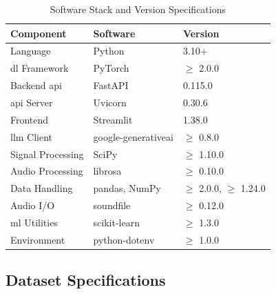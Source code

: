 \begin{table}[H]
\centering
\caption{Software Stack and Version Specifications}
\renewcommand{\arraystretch}{1.3}
\begin{tabular}{|l|l|l|}
\hline
\textbf{Component} & \textbf{Software} & \textbf{Version} \\
\hline
Language & Python & 3.10+ \\
\ac{dl} Framework & PyTorch & $\geq$ 2.0.0 \\
Backend \ac{api} & FastAPI & 0.115.0 \\
\ac{api} Server & Uvicorn & 0.30.6 \\
Frontend & Streamlit & 1.38.0 \\
\ac{llm} Client & google-generativeai & $\geq$ 0.8.0 \\
Signal Processing & SciPy & $\geq$ 1.10.0 \\
Audio Processing & librosa & $\geq$ 0.10.0 \\
Data Handling & pandas, NumPy & $\geq$ 2.0.0, $\geq$ 1.24.0 \\
Audio I/O & soundfile & $\geq$ 0.12.0 \\
\ac{ml} Utilities & scikit-learn & $\geq$ 1.3.0 \\
Environment & python-dotenv & $\geq$ 1.0.0 \\
\hline
\end{tabular}
\end{table}

\subsection{Dataset Specifications}

\begin{table}[H]
\centering
\caption{Dataset Specifications for the Three Models}
\renewcommand{\arraystretch}{1.3}
\end{table}

